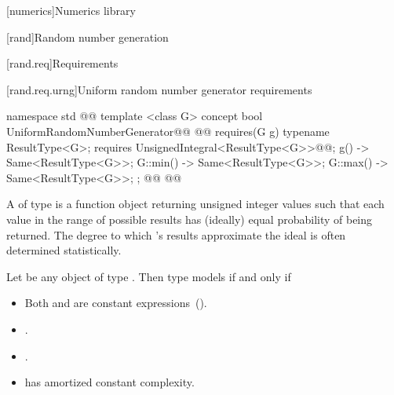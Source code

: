 [numerics]{Numerics library}

\setcounter{section}{4}
[rand]{Random number generation}

[rand.req]{Requirements}


\setcounter{subsubsection}{2}
[rand.req.urng]{Uniform random number generator requirements}%
%

\begin{addedblock}
\begin{codeblock}
namespace std { @@
  template <class G>
  concept bool UniformRandomNumberGenerator@\newtxt{() \{}\oldtxt{ =}@
    @@ requires(G g) {
      typename ResultType<G>;
      requires UnsignedIntegral<ResultType<G>>@\newtxt{()}@;
      { g() } -> Same<ResultType<G>>;
      { G::min() } -> Same<ResultType<G>>;
      { G::max() } -> Same<ResultType<G>>;
    };
  @\newtxt{\}}@
}@\newtxt{\}\}}@
\end{codeblock}
\end{addedblock}

\pnum
A 
 of type 
is a function object
returning unsigned integer values
such that each value
in the range of possible results
has (ideally) equal probability
of being returned.
\enternote
 The degree to which 's results
 approximate the ideal
 is often determined statistically.
\exitnote


\begin{addedblock}
\pnum
Let  be any object of type . Then type  models
 if and only if

\begin{itemize}
\item Both  and  are constant expressions~().
\item {}.
\item {}.
\item {} has amortized constant complexity.
\end{itemize}

\end{addedblock}